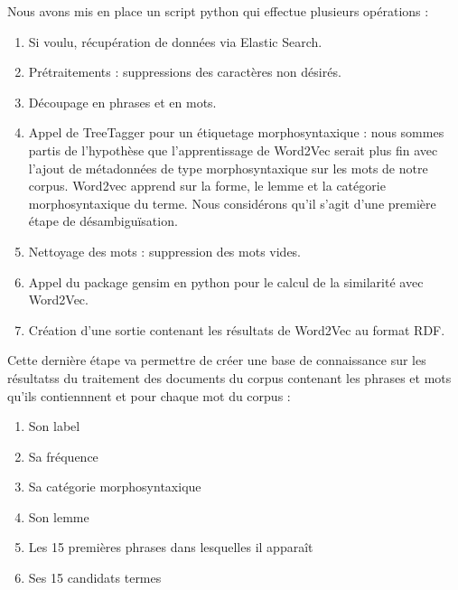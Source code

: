 Nous avons mis en place un script python qui effectue plusieurs opérations :
\begin{enumerate}

\item Si voulu, récupération de données via Elastic Search.
\item Prétraitements : suppressions des caractères non désirés.
\item Découpage en phrases et en mots.
\item Appel de TreeTagger \cite{Schmid94probabilisticpart-of-speech} pour un étiquetage morphosyntaxique : nous sommes partis de l'hypothèse que l'apprentissage de Word2Vec serait plus fin avec l'ajout de métadonnées de type morphosyntaxique sur les mots de notre corpus. Word2vec apprend sur la forme, le lemme et la catégorie morphosyntaxique du terme. Nous considérons qu'il s'agit d'une première étape de désambiguïsation.
\item Nettoyage des mots : suppression des mots vides.
\item Appel du package gensim en python pour le calcul de la similarité avec Word2Vec.
\item Création d'une sortie contenant les résultats de Word2Vec au format RDF.
\end{enumerate}
Cette dernière étape va permettre de créer une base de connaissance sur les résultatss du traitement des documents du corpus  contenant les phrases et mots qu'ils contiennnent et pour chaque mot du corpus :
\begin{enumerate}
\item	Son label
\item	Sa fréquence
\item	Sa catégorie morphosyntaxique
\item	Son lemme
\item	Les 15 premières phrases dans lesquelles il apparaît
\item	Ses 15 candidats termes
\end{enumerate}
